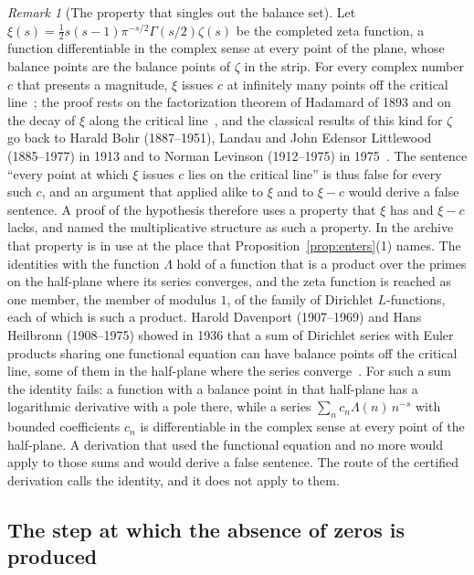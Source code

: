 \documentclass[11pt]{article}
\theoremstyle{definition}
\theoremstyle{remark}
\newtheorem{remark}[theorem]{Remark}
\begin{document}
\begin{remark}[The property that singles out the balance set]\label{rem:family}
Let $\xi(s)=\tfrac12s(s-1)\pi^{-s/2}\Gamma(s/2)\zeta(s)$ be the completed zeta function, a function differentiable in the complex sense at every point of the plane, whose balance points are the balance points of $\zeta$ in the strip. For every complex number $c$ that presents a magnitude, $\xi$ issues $c$ at infinitely many points off the critical line~\citep{tv}; the proof rests on the factorization theorem of Hadamard of 1893 and on the decay of $\xi$ along the critical line~\citep{hadamard93}, and the classical results of this kind for $\zeta$ go back to Harald Bohr (1887--1951), Landau and John Edensor Littlewood (1885--1977) in 1913 and to Norman Levinson (1912--1975) in 1975~\citep{bll,levinson}. The sentence ``every point at which $\xi$ issues $c$ lies on the critical line'' is thus false for every such $c$, and an argument that applied alike to $\xi$ and to $\xi-c$ would derive a false sentence. A proof of the hypothesis therefore uses a property that $\xi$ has and $\xi-c$ lacks, and \citet{tv} named the multiplicative structure as such a property. In the archive that property is in use at the place that Proposition~\ref{prop:enters}(1) names. The identities with the function $\Lambda$ hold of a function that is a product over the primes on the half-plane where its series converges, and the zeta function is reached as one member, the member of modulus $1$, of the family of Dirichlet $L$-functions, each of which is such a product. Harold Davenport (1907--1969) and Hans Heilbronn (1908--1975) showed in 1936 that a sum of Dirichlet series with Euler products sharing one functional equation can have balance points off the critical line, some of them in the half-plane where the series converge~\citep{dh36}. For such a sum the identity fails: a function with a balance point in that half-plane has a logarithmic derivative with a pole there, while a series $\sum_n c_n\Lambda(n)\,n^{-s}$ with bounded coefficients $c_n$ is differentiable in the complex sense at every point of the half-plane. A derivation that used the functional equation and no more would apply to those sums and would derive a false sentence. The route of the certified derivation calls the identity, and it does not apply to them.
\end{remark}

\subsection{The step at which the absence of zeros is produced}\label{sec:junction}
\end{document}

